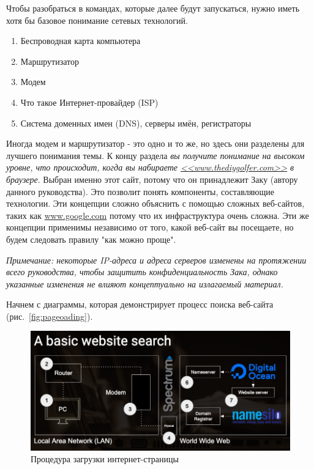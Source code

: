 \documentclass[12pt]{article}
\providecommand{\tightlist}{%
  \setlength{\itemsep}{0pt}\setlength{\parskip}{0pt}}
\begin{document}
Чтобы разобраться в командах, которые далее будут запускаться, нужно
иметь хотя бы базовое понимание сетевых технологий.

\begin{enumerate}
\tightlist
\item
  Беспроводная карта компьютера
\item
  Маршрутизатор
\item
  Модем
\item
  Что такое Интернет-провайдер (ISP)
\item
  Система доменных имен (DNS), серверы имён, регистраторы
\end{enumerate}

Иногда модем и маршрутизатор - это одно и то же, но здесь они разделены
для лучшего понимания темы. К концу раздела \emph{вы получите понимание
на высоком уровне, что происходит, когда вы набираете
\href{http://www.thediygolfer.com}{<<www.thediygolfer.com>>} в браузере}.
Выбран именно этот сайт, потому что он принадлежит Заку (автору
данного руководства). Это позволит понять компоненты, составляющие
технологии. Эти концепции сложно объяснить с помощью сложных веб-сайтов,
таких как \href{http://www.google.com}{www.google.com} потому что их
инфраструктура очень сложна. Эти же концепции применимы независимо от
того, какой веб-сайт вы посещаете, но будем следовать правилу "как можно
проще".

\emph{Примечание: некоторые IP-адреса и адреса серверов изменены на
протяжении всего руководства, чтобы защитить конфиденциальность Зака,
однако указанные изменения не влияют концептуально на излагаемый
материал.}

Начнем с диаграммы, которая демонстрирует процесс поиска веб-сайта (рис.~\ref{fig:pageoading}).

\begin{figure}[tbh]
  \centering
  \includegraphics[width=0.9\linewidth]{blog/2019/bash-essentials/basic-web-search.jpg}

  \caption{Процедура загрузки интернет-страницы}
  \label{fig:pageloading}
\end{figure}
\end{document}
